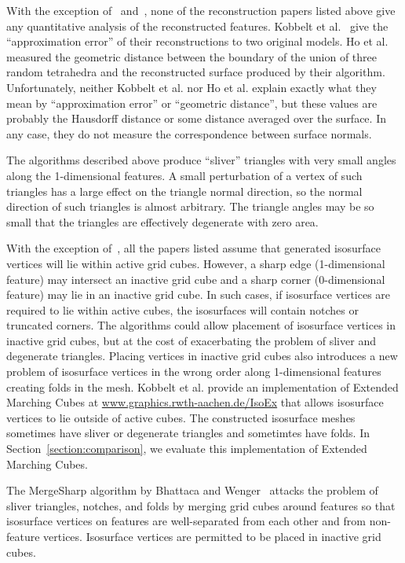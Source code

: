 With the exception of~\cite{kbsh-fssev-01} and~\cite{hwco-cmsaf-05},
none of the reconstruction papers listed above give any quantitative
analysis of the reconstructed features.
Kobbelt et al.~\cite{kbsh-fssev-01} give the ``approximation error''
of their reconstructions to two original models.
Ho et al.~\cite{hwco-cmsaf-05} measured the geometric distance
between the boundary of the union of three random tetrahedra and 
the reconstructed surface produced by their algorithm.
Unfortunately, neither Kobbelt et al. nor Ho et al. explain
exactly what they mean by ``approximation error'' or ``geometric distance'',
but these values are probably the Hausdorff distance 
or some distance averaged over the surface.
In any case, they do not measure the correspondence 
between surface normals.

The algorithms described above 
produce ``sliver'' triangles with very small angles 
along the 1-dimensional features.
A small perturbation of a vertex of such triangles
has a large effect on the triangle normal direction,
so the normal direction of such triangles is almost arbitrary.
The triangle angles may be so small that the triangles are effectively
degenerate with zero area.

With the exception of~\cite{sw-dmcpc-04},
all the papers listed assume
that generated isosurface vertices will lie within active grid cubes.
However, a sharp edge (1-dimensional feature) may intersect 
an inactive grid cube  and a sharp corner (0-dimensional feature) 
may lie in an inactive grid cube.
In such cases, if isosurface vertices are required to lie within active cubes,
the isosurfaces will contain notches or truncated corners.
The algorithms could allow placement of isosurface vertices
in inactive grid cubes,
but at the cost of exacerbating the problem 
of sliver and degenerate triangles.
Placing vertices in inactive grid cubes also introduces a new problem 
of isosurface vertices in the wrong order along 1-dimensional features
creating folds in the mesh.
Kobbelt et al. provide an implementation of Extended Marching Cubes 
at \href{https://www.graphics.rwth-aachen.de/IsoEx}{www.graphics.rwth-aachen.de/IsoEx}
that allows isosurface vertices to lie outside of active cubes.
The constructed isosurface meshes sometimes have sliver or degenerate triangles
and sometimtes have folds.
In Section~\ref{section:comparison},
we evaluate this implementation of Extended Marching Cubes.

The MergeSharp algorithm by Bhattaca and Wenger~\cite{bw-cisec-13,bw-erm-13}
attacks the problem of sliver triangles, notches, and folds
by merging grid cubes around features
so that isosurface vertices on features are well-separated 
from each other and from non-feature vertices.
Isosurface vertices are permitted to be placed in inactive grid cubes.

